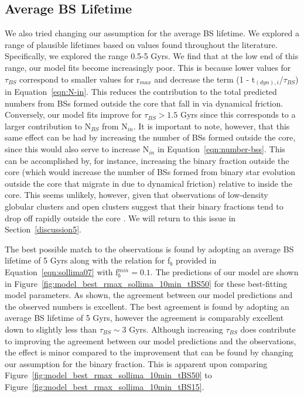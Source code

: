 \subsection{Average BS Lifetime} \label{lifetime}

We also tried changing our assumption for the average BS lifetime.  We
explored a range of plausible lifetimes based on values found
throughout the literature.  Specifically, we explored the range 0.5-5
Gyrs.  We find that at 
the low end of this range, our model fits become increasingly poor.
This is because lower values for $\tau_{BS}$ correspond to smaller
values for r$_{max}$ and decrease the term (1 -
t$_{(dyn),i}$/$\tau_{BS}$) in Equation~\ref{eqn:N-in}.  This reduces the
contribution to the total predicted 
numbers from BSs formed outside the core that fall in via dynamical 
friction.  Conversely, our model fits
improve for $\tau_{BS} > 1.5$ Gyrs since this corresponds to a larger
contribution to N$_{BS}$ from N$_{in}$.  It is important to note,
however, that this same effect can be had by increasing the 
number of BSs formed outside the core, since this would also
serve to increase N$_{in}$ in Equation~\ref{eqn:number-bss}.  This
can be accomplished by, for instance, increasing the binary fraction
outside the core (which would increase the
number of BSs formed from binary star evolution outside the core that
migrate in due to dynamical friction) relative to inside the core.
This seems unlikely, however, given that observations of low-density
globular clusters and open clusters suggest that their binary
fractions tend to drop off rapidly outside the core
\citep[e.g.][]{sollima07}.  We 
will return to this issue in Section~\ref{discussion5}.

The best possible match to the observations is
found by adopting an average BS lifetime of 5 Gyrs along with the
relation for f$_b$ provided in Equation~\ref{eqn:sollima07} with 
f$_b^{min} = 0.1$.  The predictions of our model 
are shown in Figure~\ref{fig:model_best_rmax_sollima_10min_tBS50} for
these best-fitting model parameters.  As shown, the agreement
between our model predictions and the observed numbers is excellent.
The best agreement is found by adopting an average BS lifetime of 5
Gyrs, however the agreement is comparably excellent down to 
slightly less than $\tau_{BS} \sim 3$ Gyrs.  Although increasing
$\tau_{BS}$ does contribute to improving the 
agreement between our model predictions and the observations, the
effect is minor compared to the improvement that 
can be found by changing our assumption for the binary fraction.
This is apparent upon comparing 
Figure~\ref{fig:model_best_rmax_sollima_10min_tBS50} to 
Figure~\ref{fig:model_best_rmax_sollima_10min_tBS15}.  

